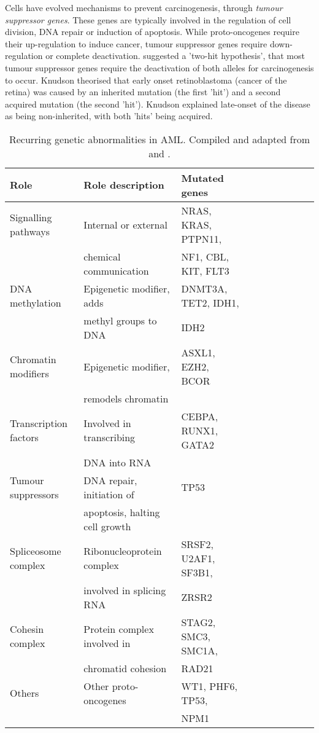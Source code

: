 Cells have evolved mechanisms to prevent carcinogenesis, through \textit{tumour suppressor genes}. These genes are typically involved in the regulation of cell division, DNA repair or induction of apoptosis. While proto-oncogenes require their up-regulation to induce cancer, tumour suppressor genes require down-regulation or complete deactivation. \cite{knudson1971mutation} suggested a 'two-hit hypothesis', that most tumour suppressor genes require the deactivation of both alleles for carcinogenesis to occur. Knudson theorised that early onset retinoblastoma (cancer of the retina) was caused by an inherited mutation (the first 'hit') and a second acquired mutation (the second 'hit'). Knudson explained late-onset of the disease as being non-inherited, with both 'hits' being acquired. 

\begin{table}[H]
\label{tab:genetic abnormalities}
    \centering
    \caption{Recurring genetic abnormalities in \ac{AML}. Compiled and adapted from \cite{dinardo2016mutations} and \cite{lindsley2015acute}.}
    \begin{tabular}{llllllllll}
    \toprule
\textbf{Role} & \textbf{Role description} & \textbf{Mutated genes} &  &  \\ \midrule
Signalling pathways & Internal or external & NRAS, KRAS, PTPN11, &  &  \\
 & chemical communication & NF1, CBL, KIT, FLT3 &  &  \\ \hline
DNA methylation & Epigenetic modifier, adds & DNMT3A, TET2, IDH1, &  &  \\
 & methyl groups to DNA & IDH2 &  &  \\ \hline
Chromatin modifiers & Epigenetic modifier, & ASXL1, EZH2, BCOR &  &  \\
 & remodels chromatin &  &  &  \\ \hline
Transcription factors & Involved in transcribing & CEBPA, RUNX1, GATA2 &  &  \\
 & DNA into RNA &  &  &  \\ \hline
Tumour suppressors & DNA repair, initiation of & TP53 &  &  \\
 & apoptosis, halting cell growth &  &  &  \\ \hline
Spliceosome complex & Ribonucleoprotein complex & SRSF2, U2AF1, SF3B1, &  &  \\
 & involved in splicing RNA & ZRSR2 &  &  \\ \hline
Cohesin complex & Protein complex involved in & STAG2, SMC3, SMC1A, &  &  \\
 & chromatid cohesion & RAD21 &  &  \\ \hline
Others & Other proto-oncogenes & WT1, PHF6, TP53, &  &  \\
 &  & NPM1 &  &  \\ \bottomrule
    \end{tabular}
\end{table}

